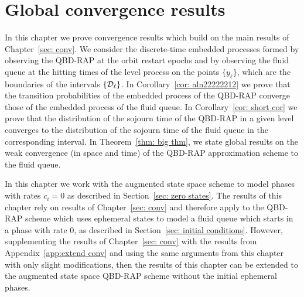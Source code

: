 \chapter{Global convergence results}\label{ch: global results}
In this chapter we prove convergence results which build on the main results of Chapter~\ref{sec: conv}. We consider the discrete-time embedded processes formed by observing the QBD-RAP at the orbit restart epochs and by observing the fluid queue at the hitting times of the level process on the points \(\{y_\ell\}\), which are the boundaries of the intervals \(\{\mathcal{D}_\ell\}\). In Corollary~\ref{cor: aln22222212} we prove that the transition probabilities of the embedded process of the QBD-RAP converge those of the embedded process of the fluid queue. In Corollary~\ref{cor: short cor} we prove that the distribution of the sojourn time of the QBD-RAP in a given level converges to the distribution of the sojourn time of the fluid queue in the corresponding interval. In Theorem~\ref{thm: big thm}, we state global results on the weak convergence (in space and time) of the QBD-RAP approximation scheme to the fluid queue. 

In this chapter we work with the augmented state space scheme to model phases with rates \(c_i=0\) as described in Section~\ref{sec: zero states}. The results of this chapter rely on results of Chapter~\ref{sec: conv} and therefore apply to the QBD-RAP scheme which uses ephemeral states to model a fluid queue which starts in a phase with rate \(0\), as described in Section~\ref{sec: initial conditions}. However, supplementing the results of Chapter~\ref{sec: conv} with the results from Appendix~\ref{app:extend conv} and using the same arguments from this chapter with only slight modifications, then the results of this chapter can be extended to the augmented state space QBD-RAP scheme without the initial ephemeral phases. 

